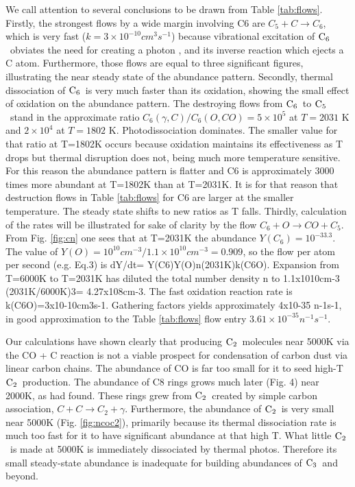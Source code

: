 \documentclass[manuscript]{aastex}
\newcommand{\ctwo}{${\rm C}_2$}
\newcommand{\cthree}{${\rm C}_3$}
\newcommand{\cfive}{${\rm C}_5$}
\newcommand{\csix}{${\rm C}_6$}
\begin{document}
We call attention to several conclusions to be drawn from Table \ref{tab:flows}.
Firstly, the strongest flows by a wide margin involving C6 are
$C_5 + C \to C_6$,
which is very fast ($k = 3 \times 10^{-10} cm^3 s^{-1}$)
because vibrational excitation of \csix\
obviates the need for creating a photon \citep{1999Sci...283.1290C},
and its inverse reaction which ejects a C atom. Furthermore, those flows
are equal to three significant figures, illustrating the near steady
state of the abundance pattern. Secondly, thermal dissociation of \csix\ is
very much faster than its oxidation, showing the small effect of oxidation
on the abundance pattern. The destroying flows from \csix\ to \cfive\
stand in the approximate ratio $C_6(\gamma,C)/C_6(O,CO) = 5 \times 10^5$
at $T = 2031$ K and $2 \times 10^4$ at $T = 1802$ K.
Photodissociation dominates. The smaller value for that ratio at T=1802K
occurs because oxidation maintains its effectiveness as T drops but
thermal disruption does not, being much more temperature sensitive.
For this reason the abundance pattern is flatter and C6 is approximately
3000 times more abundant at T=1802K than at T=2031K.
It is for that reason that destruction flows in Table \ref{tab:flows}
for C6 are
larger at the smaller temperature.
The steady state shifts to new ratios as T falls.
Thirdly, calculation of the rates will be illustrated for sake of clarity
by the flow $C_6 + O \to CO + C_5$.
From Fig. \ref{fig:cn}
one sees that at T=2031K the abundance $Y(C_6) = 10^{-33.3}$.
The value of $Y(O) = 10^{10} cm^{-3} / 1.1 \times 10^{10} cm^{-3} = 0.909$,
so the flow per atom per
second (e.g. Eq.3) is dY/dt= Y(C6)Y(O)n(2031K)k(C6O).
Expansion from T=6000K to T=2031K has diluted the total number
density n to 1.1x1010cm-3 (2031K/6000K)3= 4.27x108cm-3.
The fast oxidation reaction rate is  k(C6O)=3x10-10cm3s-1.
Gathering factors yields approximately 4x10-35 n-1s-1,
in good approximation to the Table \ref{tab:flows}
flow entry $3.61 \times 10^{-35} n^{-1}s^{-1}$. 

Our calculations have shown clearly that producing \ctwo\ molecules near
5000K via the CO + C reaction \citep{2009ApJ...703..642C} is not a viable
prospect for condensation of carbon dust via linear carbon chains.
The abundance of CO is far too small for it to seed high-T \ctwo\ production.
The abundance of C8 rings grows much later (Fig. 4) near 2000K, as
\citet{1999Sci...283.1290C,2001ApJ...562..480C} had found.
These rings grew from \ctwo\ created by simple carbon association,
$C + C \to C_2 + \gamma$.
Furthermore, the abundance of \ctwo\ is very small near 5000K
(Fig. \ref{fig:ncoc2}),
primarily because its thermal dissociation rate is much too fast for
it to have significant abundance at that high T.
What little \ctwo\ is made at 5000K is immediately dissociated by
thermal photos. Therefore its small steady-state abundance is inadequate
for building abundances of \cthree\ and beyond. 
\end{document}
